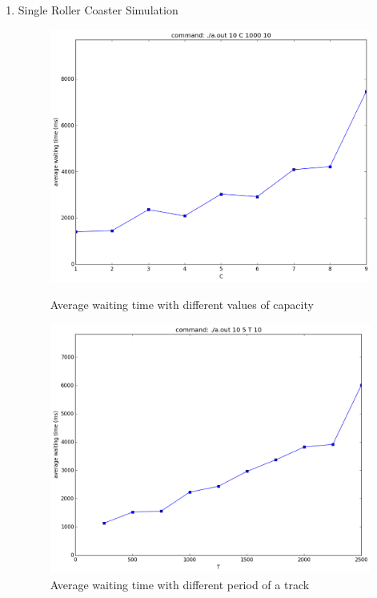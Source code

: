 \documentclass[12pt]{article}
\begin{document}
\begin{enumerate}
	\item Single Roller Coaster Simulation
	\begin{figure}[ht]
		\hspace{-20pt}
		\begin{minipage}{.48\textwidth}
			\includegraphics[scale=.35]{./SRCC_C.png}
			\caption{Average waiting time with different values of capacity}
		\end{minipage}
		\hspace{40pt}
		\begin{minipage}{.48\textwidth}
			\includegraphics[scale=.35]{./SRCC_T.png}
			\caption{Average waiting time with different period of a track}
		\end{minipage}
	\end{figure}


\end{enumerate}
\end{document}

